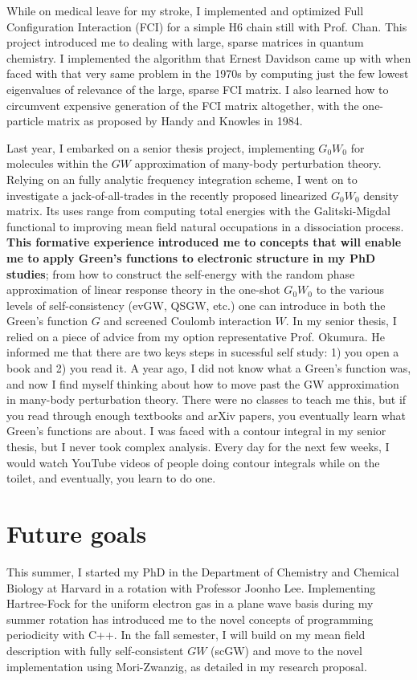 \documentclass[11pt]{article} %
\begin{document}
While on medical leave for my stroke, I implemented and optimized Full Configuration Interaction (FCI) for a simple H6 chain still with Prof. Chan. This project introduced me to dealing with large, sparse matrices in quantum chemistry. I implemented the algorithm that Ernest Davidson came up with when faced with that very same problem in the 1970s by computing just the few lowest eigenvalues of relevance of the large, sparse FCI matrix. I also learned how to circumvent expensive generation of the FCI matrix altogether, with the one-particle matrix as proposed by Handy and Knowles in 1984.

Last year, I embarked on a senior thesis project, implementing $G_0W_0$ for molecules within the $GW$ approximation of many-body perturbation theory. Relying on an fully analytic frequency integration scheme, I went on to investigate a jack-of-all-trades in the recently proposed linearized $G_0W_0$ density matrix. Its uses range from computing total energies with the Galitski-Migdal functional to improving mean field natural occupations in a dissociation process. \textbf{This formative experience introduced me to concepts that will enable me to apply Green's functions to electronic structure in my PhD studies}; from how to construct the self-energy with the random phase approximation of linear response theory in the one-shot $G_0W_0$ to the various levels of self-consistency (evGW, QSGW, etc.) one can introduce in both the Green's function $G$ and screened Coulomb interaction $W$. In my senior thesis, I relied on a piece of advice from my option representative Prof. Okumura. He informed me that there are two keys steps in sucessful self study: 1) you open a book and 2) you read it. A year ago, I did not know what a Green's function was, and now I find myself thinking about how to move past the GW approximation in many-body perturbation theory. There were no classes to teach me this, but if you read through enough textbooks and arXiv papers, you eventually learn what Green’s functions are about. I was faced with a contour integral in my senior thesis, but I never took complex analysis. Every day for the next few weeks, I would watch YouTube videos of people doing contour integrals while on the toilet, and eventually, you learn to do one.
\section{Future goals}  
This summer, I started my PhD in the Department of Chemistry and Chemical Biology at Harvard in a rotation with Professor Joonho Lee. Implementing Hartree-Fock for the uniform electron gas in a plane wave basis during my summer rotation has introduced me to the novel concepts of programming periodicity with C++. In the fall semester, I will build on my mean field description with fully self-consistent $GW$ (scGW) and move to the novel implementation using Mori-Zwanzig, as detailed in my research proposal.  
\end{document}
